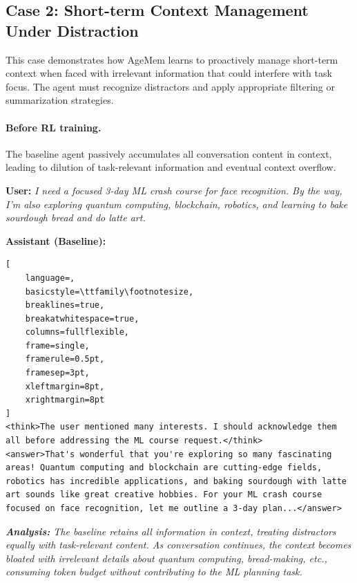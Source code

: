 \subsection{Case 2: Short-term Context Management Under Distraction}

This case demonstrates how AgeMem learns to proactively manage short-term context when faced with irrelevant information that could interfere with task focus. The agent must recognize distractors and apply appropriate filtering or summarization strategies.

\paragraph{Before RL training.}
The baseline agent passively accumulates all conversation content in context, leading to dilution of task-relevant information and eventual context overflow.

\vspace{0.3cm}
\noindent\textbf{User:} \textit{I need a focused 3-day ML crash course for face recognition. By the way, I'm also exploring quantum computing, blockchain, robotics, and learning to bake sourdough bread and do latte art.}

\vspace{0.2cm}
\noindent\textbf{Assistant (Baseline):}
\begin{footnotesize}
\begin{lstlisting}[
    language=,
    basicstyle=\ttfamily\footnotesize,
    breaklines=true,
    breakatwhitespace=true,
    columns=fullflexible,
    frame=single,
    framerule=0.5pt,
    framesep=3pt,
    xleftmargin=8pt,
    xrightmargin=8pt
]
<think>The user mentioned many interests. I should acknowledge them all before addressing the ML course request.</think>
<answer>That's wonderful that you're exploring so many fascinating areas! Quantum computing and blockchain are cutting-edge fields, robotics has incredible applications, and baking sourdough with latte art sounds like great creative hobbies. For your ML crash course focused on face recognition, let me outline a 3-day plan...</answer>
\end{lstlisting}
\end{footnotesize}

\vspace{0.25cm}
\noindent\textit{\textbf{Analysis:} The baseline retains all information in context, treating distractors equally with task-relevant content. As conversation continues, the context becomes bloated with irrelevant details about quantum computing, bread-making, etc., consuming token budget without contributing to the ML planning task.}

